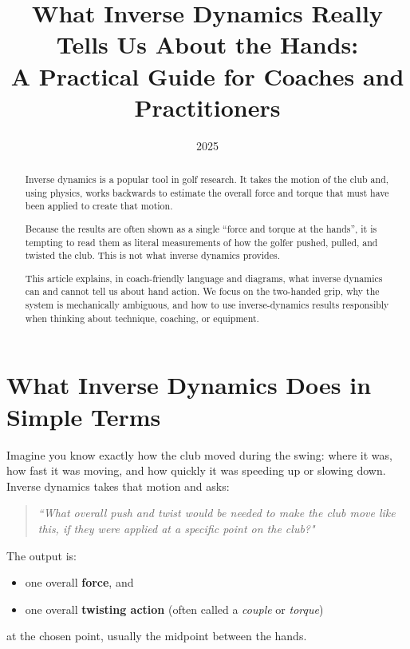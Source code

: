 \documentclass[12pt]{article}
\title{\Large\bfseries
What Inverse Dynamics Really Tells Us About the Hands:\\[4pt]
A Practical Guide for Coaches and Practitioners}
\author{2025}
\date{}
\begin{document}
\maketitle

\begin{abstract}
Inverse dynamics is a popular tool in golf research.  
It takes the motion of the club and, using physics, works backwards to estimate the overall force and torque that must have been applied to create that motion.  

Because the results are often shown as a single ``force and torque at the hands'', it is tempting to read them as literal measurements of how the golfer pushed, pulled, and twisted the club.  
This is not what inverse dynamics provides.

This article explains, in coach-friendly language and diagrams, what inverse dynamics can and cannot tell us about hand action.  
We focus on the two-handed grip, why the system is mechanically ambiguous, and how to use inverse-dynamics results responsibly when thinking about technique, coaching, or equipment.
\end{abstract}

\tableofcontents
\newpage

\section{What Inverse Dynamics Does in Simple Terms}

Imagine you know exactly how the club moved during the swing: where it was, how fast it was moving, and how quickly it was speeding up or slowing down.  
Inverse dynamics takes that motion and asks:

\begin{quote}
    \emph{``What overall push and twist would be needed to make the club move like this, if they were applied at a specific point on the club?"}
\end{quote}

The output is:
\begin{itemize}
    \item one overall \textbf{force}, and
    \item one overall \textbf{twisting action} (often called a \emph{couple} or \emph{torque})
\end{itemize}
at the chosen point, usually the midpoint between the hands.
\end{document}
